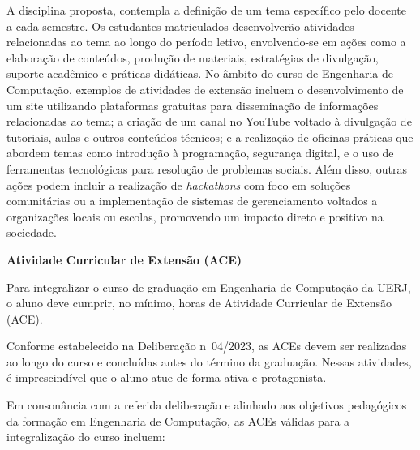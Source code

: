 A disciplina proposta, contempla a definição de um tema específico pelo docente a cada semestre. Os estudantes matriculados desenvolverão atividades relacionadas ao tema ao longo do período letivo, envolvendo-se em ações como a elaboração de conteúdos, produção de materiais, estratégias de divulgação, suporte acadêmico e práticas didáticas. No âmbito do curso de Engenharia de Computação, exemplos de atividades de extensão incluem o desenvolvimento de um site utilizando plataformas gratuitas para disseminação de informações relacionadas ao tema; a criação de um canal no YouTube voltado à divulgação de tutoriais, aulas e outros conteúdos técnicos; e a realização de oficinas práticas que abordem temas como introdução à programação, segurança digital, e o uso de ferramentas tecnológicas para resolução de problemas sociais. Além disso, outras ações podem incluir a realização de \textit{hackathons} com foco em soluções comunitárias ou a implementação de sistemas de gerenciamento voltados a organizações locais ou escolas, promovendo um impacto direto e positivo na sociedade.

\textbf{Atividade Curricular de Extensão (ACE)}

Para integralizar o curso de graduação em Engenharia de Computação da UERJ, o aluno deve cumprir, no mínimo, \totalHorasACE horas de Atividade Curricular de Extensão (ACE).

Conforme estabelecido na Deliberação n\textordmasculine~04/2023, as ACEs devem ser realizadas ao longo do curso e concluídas antes do término da graduação. Nessas atividades, é imprescindível que o aluno atue de forma ativa e protagonista.

Em consonância com a referida deliberação e alinhado aos objetivos pedagógicos da formação em Engenharia de Computação, as ACEs válidas para a integralização do curso incluem:


